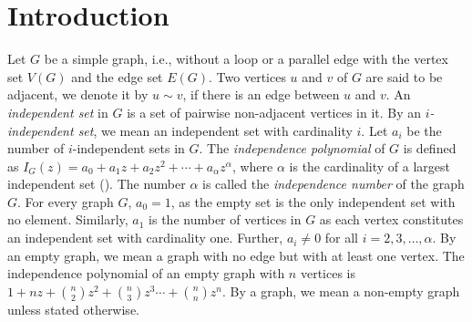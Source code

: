 \documentclass[12pt,a4paper]{article}
\theoremstyle{plain}
\numberwithin{equation}{section}
\begin{document}
 \section{Introduction}
 Let $G$ be a simple graph, i.e., without a loop or a parallel edge with the vertex set $V(G)$ and the edge set $E(G)$. Two vertices $u$ and $v$ of $G$ are said to be adjacent, we denote it by $u\sim v$, if there is an edge between $u$ and $v$. An {\em independent set} in $G$ is a set of pairwise non-adjacent vertices in it. By an {\em $i$-independent set}, we mean an independent set with cardinality $i$. Let $a_i$ be the number of $i$-independent sets in $G$. The {\em independence polynomial} of $G$  is defined as $I_G(z) =a_0 + a_1 z + a_2 z^2+\cdots+a_\alpha z^{\alpha}$, where $\alpha$ is the cardinality of a largest independent set (\cite{GH}). The number $\alpha$ is called the {\em independence number} of the graph $G$. For every graph $G$, $a_0=1$, as the empty set is the only independent set with no element. Similarly, $a_1$ is the number of vertices in $G$ as each vertex constitutes an independent set with cardinality one. Further, $a_i \neq 0$ for all $i=2, 3,\ldots, \alpha$.  By an empty graph, we mean a graph with no edge but with at least one vertex. The independence polynomial of an empty graph with $n$ vertices is $1+nz+\binom{n}{2}z^2+\binom{n}{3}z^3\cdots +\binom{n}{n}z^n$. By a graph, we mean a non-empty graph unless stated otherwise. 
 
\end{document}
